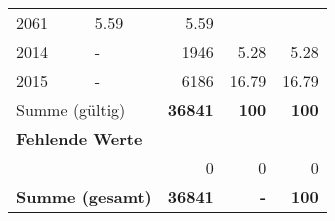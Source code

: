 \begin{longtable}{lXrrr}
       \num{2061} &
       \num[round-mode=places,round-precision=2]{5.59} &
         \num[round-mode=places,round-precision=2]{5.59} \\

     2014 &
     \multicolumn{1}{X}{ -  } &


       \num{1946} &
       \num[round-mode=places,round-precision=2]{5.28} &
         \num[round-mode=places,round-precision=2]{5.28} \\

     2015 &
     \multicolumn{1}{X}{ -  } &


       \num{6186} &
       \num[round-mode=places,round-precision=2]{16.79} &
         \num[round-mode=places,round-precision=2]{16.79} \\
     \midrule
     \multicolumn{2}{l}{Summe (gültig)} &
       \textbf{\num{36841}} &
     \textbf{\num{100}} &
       \textbf{\num[round-mode=places,round-precision=2]{100}} \\
     \multicolumn{5}{l}{\textbf{Fehlende Werte}}\\
      & & 0 & 0 & 0 \\
     \midrule
     \multicolumn{2}{l}{\textbf{Summe (gesamt)}} &
          \textbf{\num{36841}} &
        \textbf{-} &
        \textbf{\num{100}} \\
     \bottomrule
     \end{longtable}
     
